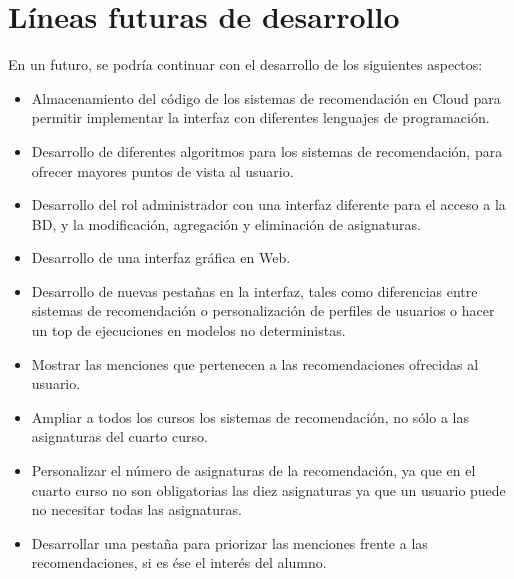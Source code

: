\section{Líneas futuras de desarrollo}
En un futuro, se podría continuar con el desarrollo de los siguientes aspectos: 
\begin{itemize}
\item Almacenamiento del código de los sistemas de recomendación en Cloud para permitir implementar la interfaz con diferentes lenguajes de programación. 
\item Desarrollo de diferentes algoritmos para los sistemas de recomendación, para ofrecer mayores puntos de vista al usuario. 
\item Desarrollo del rol administrador con una interfaz diferente para el acceso a la BD, y la modificación, agregación y eliminación de asignaturas. 
\item Desarrollo de una interfaz gráfica en Web. 
\item Desarrollo de  nuevas pestañas en la interfaz, tales como diferencias entre sistemas de recomendación o personalización de perfiles de usuarios o hacer un top de ejecuciones en modelos no deterministas. 
\item Mostrar  las menciones que pertenecen a las  recomendaciones ofrecidas al usuario. 
\item Ampliar a todos los cursos los sistemas de recomendación, no sólo a las asignaturas del cuarto curso. 
\item Personalizar el número de asignaturas de la recomendación, ya que en el cuarto curso no son obligatorias las diez asignaturas ya que un usuario puede no necesitar todas las asignaturas. 
\item Desarrollar una pestaña para priorizar las menciones frente a las recomendaciones, si es ése el interés del alumno. 

\end{itemize}